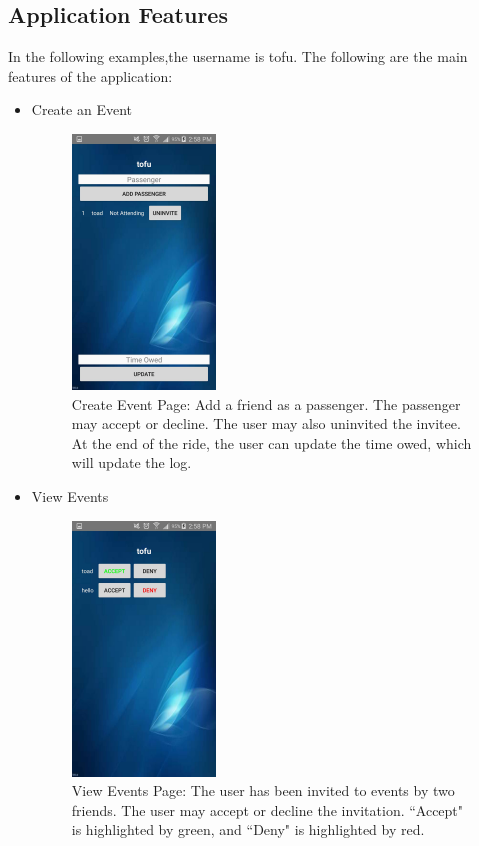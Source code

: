 \documentclass[12pt]{article}
\begin{document}
\subsection{Application Features}
In the following examples,the username is tofu.
The following are the main features of the application:
\begin{itemize}
\item Create an Event
    \begin{figure}[H]
        \centering
        \includegraphics[width=1.5in]{create_event.jpg}
        \caption{Create Event Page: Add a friend as a passenger. The passenger may accept or decline.
        The user may also uninvited the invitee. At the end of the ride, the user can update the time owed, 
        which will update the log.}
        \label{create_event}
    \end{figure} 
\item View Events
    \begin{figure}[H]
        \centering
        \includegraphics[width=1.5in]{view_events.jpg}
        \caption{View Events Page: The user has been invited to events by two friends. The user may accept 
        or decline the invitation. ``Accept" is highlighted by green, and ``Deny" is highlighted by red.}

\end{figure}
\end{itemize}
\end{document}
